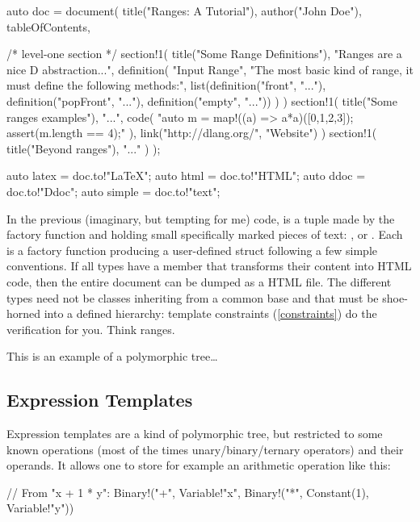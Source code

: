 \begin{dcode}
auto doc = 
document(
    title("Ranges: A Tutorial"),
    author("John Doe"),
    tableOfContents,
    
    /* level-one section */
    section!1(
        title("Some Range Definitions"),
        "Ranges are a nice D abstraction...",
        definition(
            "Input Range", 
            "The most basic kind of range, it must define the following methods:",
            list(definition("front", "..."),
                 definition("popFront", "..."),
                 definition("empty", "..."))
        )
    )
    section!1(
        title("Some ranges examples"),
        "...",
        code(
            "auto m = map!((a) => a*a)([0,1,2,3]);
             assert(m.length == 4);"
        ),
        link("http://dlang.org/", "Website")
    )
    section!1(
        title("Beyond ranges"),
        "..."
    )
);

auto latex = doc.to!"LaTeX";
auto html = doc.to!"HTML";
auto ddoc = doc.to!"Ddoc";
auto simple = doc.to!"text";
\end{dcode}

In the previous (imaginary, but tempting for me) code,  is a tuple made by the  factory function and holding small specifically marked pieces of text: ,  or . Each is a factory function producing a user-defined struct following a few simple conventions. If all types have a  member that transforms their content into HTML code, then the entire document can be dumped as a HTML file. The different types need not be classes inheriting from a common base and that must be shoe-horned into a defined hierarchy: template constraints (\ref{constraints}) do the verification for you. Think ranges.

This is an example of a polymorphic tree\ldots

\subsection{Expression Templates}\label{expressiontemplates}

Expression templates are a kind of polymorphic tree, but restricted to some known operations (most of the times unary/binary/ternary operators) and their operands. It allows one to store for example an arithmetic operation like this:

\begin{dcode}
// From "x + 1 * y":
Binary!("+", 
             Variable!"x",
             Binary!("*", 
                         Constant(1),
                         Variable!"y"))
\end{dcode}

